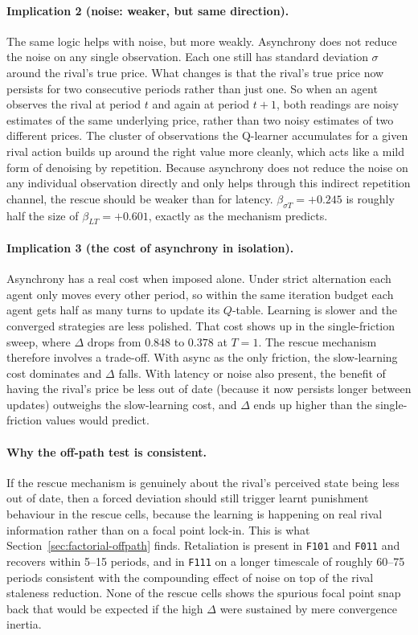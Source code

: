 \paragraph{Implication 2 (noise: weaker, but same direction).} The same logic helps with noise, but more weakly. Asynchrony does not reduce the noise on any single observation. Each one still has standard deviation $\sigma$ around the rival's true price. What changes is that the rival's true price now persists for two consecutive periods rather than just one. So when an agent observes the rival at period $t$ and again at period $t+1$, both readings are noisy estimates of the same underlying price, rather than two noisy estimates of two different prices. The cluster of observations the Q-learner accumulates for a given rival action builds up around the right value more cleanly, which acts like a mild form of denoising by repetition. Because asynchrony does not reduce the noise on any individual observation directly and only helps through this indirect repetition channel, the rescue should be weaker than for latency. $\beta_{\sigma T} = +0.245$ is roughly half the size of $\beta_{LT} = +0.601$, exactly as the mechanism predicts.

\paragraph{Implication 3 (the cost of asynchrony in isolation).} Asynchrony has a real cost when imposed alone. Under strict alternation each agent only moves every other period, so within the same iteration budget each agent gets half as many turns to update its $Q$-table. Learning is slower and the converged strategies are less polished. That cost shows up in the single-friction sweep, where $\Delta$ drops from $0.848$ to $0.378$ at $T=1$. The rescue mechanism therefore involves a trade-off. With async as the only friction, the slow-learning cost dominates and $\Delta$ falls. With latency or noise also present, the benefit of having the rival's price be less out of date (because it now persists longer between updates) outweighs the slow-learning cost, and $\Delta$ ends up higher than the single-friction values would predict.

\paragraph{Why the off-path test is consistent.} If the rescue mechanism is genuinely about the rival's perceived state being less out of date, then a forced deviation should still trigger learnt punishment behaviour in the rescue cells, because the learning is happening on real rival information rather than on a focal point lock-in. This is what Section~\ref{sec:factorial-offpath} finds. Retaliation is present in \texttt{F101} and \texttt{F011} and recovers within 5--15 periods, and in \texttt{F111} on a longer timescale of roughly 60--75 periods consistent with the compounding effect of noise on top of the rival staleness reduction. None of the rescue cells shows the spurious focal point snap back that would be expected if the high $\Delta$ were sustained by mere convergence inertia.

